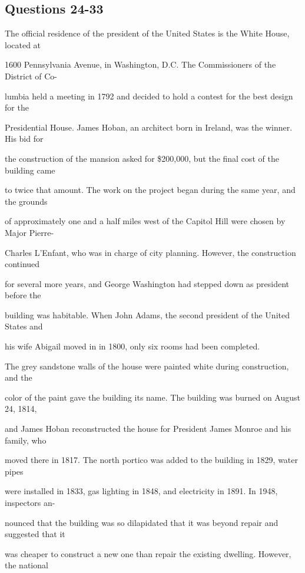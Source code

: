 \documentclass[12pt]{article}
\begin{document}
\subsection*{Questions 24-33}
\begingroup
\small
\sloppy
\setlength{\parskip}{0pt}
\setlength{\parindent}{0pt}
The official residence of the president of the United States is the White House, located at\par
1600 Pennsylvania Avenue, in Washington, D.C. The Commissioners of the District of Co-\par
lumbia held a meeting in 1792 and decided to hold a contest for the best design for the\par
Presidential House. James Hoban, an architect born in Ireland, was the winner. His bid for\par
the construction of the mansion asked for \$200,000, but the final cost of the building came\par
to twice that amount. The work on the project began during the same year, and the grounds\par
of approximately one and a half miles west of the Capitol Hill were chosen by Major Pierre-\par
Charles L'Enfant, who was in charge of city planning. However, the construction continued\par
for several more years, and George Washington had stepped down as president before the\par
building was habitable. When John Adams, the second president of the United States and\par
his wife Abigail moved in in 1800, only six rooms had been completed.\par
The grey sandstone walls of the house were painted white during construction, and the\par
color of the paint gave the building its name. The building was burned on August 24, 1814,\par
and James Hoban reconstructed the house for President James Monroe and his family, who\par
moved there in 1817. The north portico was added to the building in 1829, water pipes\par
were installed in 1833, gas lighting in 1848, and electricity in 1891. In 1948, inspectors an-\par
nounced that the building was so dilapidated that it was beyond repair and suggested that it\par
was cheaper to construct a new one than repair the existing dwelling. However, the national\par
\end{document}
